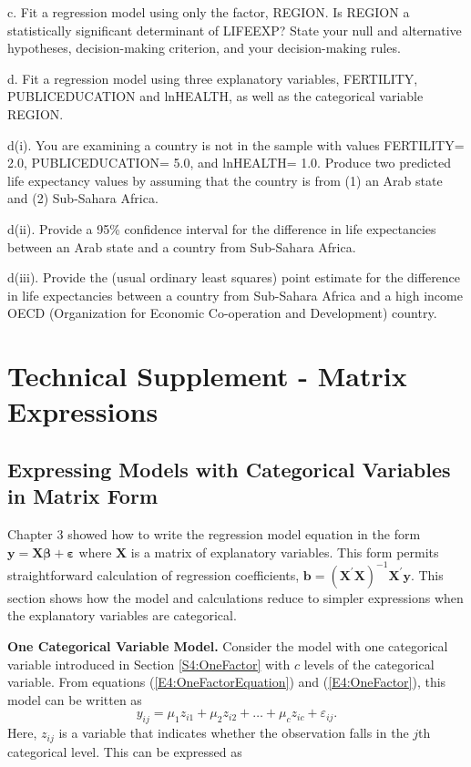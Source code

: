 \begin{exercises}
c. Fit a regression model using only the factor, REGION. Is REGION a
statistically significant determinant of LIFEEXP? State your null
and alternative hypotheses, decision-making criterion, and your
decision-making rules.

d. Fit a regression model using three explanatory variables,
FERTILITY, PUBLICEDUCATION and lnHEALTH, as well as the categorical
variable REGION.

d(i). You are examining a country is not in the sample with values
FERTILITY= 2.0, PUBLICEDUCATION= 5.0,  and lnHEALTH= 1.0. Produce
two predicted life expectancy values by assuming that the country is
from (1) an Arab state and (2) Sub-Sahara Africa.

d(ii). Provide a 95\% confidence interval for the difference in life
expectancies between an Arab state and a country from Sub-Sahara
Africa.

d(iii). Provide the (usual ordinary least squares) point estimate
for the difference in life expectancies between a country from
Sub-Sahara Africa and a high income OECD (Organization for Economic
Co-operation and Development) country.

\end{exercises}

\section{Technical Supplement - Matrix Expressions}
 \setcounter{equation}{12}
\subsection{Expressing Models with Categorical Variables in
Matrix Form}\label{S4:CatVarMatrix}

Chapter 3 showed how to write the regression model equation in the
form $\mathbf{y=X} \boldsymbol \beta + \boldsymbol \varepsilon$
where $\mathbf{X}$ is a matrix of explanatory variables. This form
permits straightforward calculation of regression coefficients,
$\mathbf{b} = \left(\mathbf{X}^{\prime}
\mathbf{X}\right)^{-1}\mathbf{X}^{\prime} \mathbf{y}$. This section
shows how the model and calculations reduce to simpler expressions
when the explanatory variables are categorical.


\textbf{One Categorical Variable Model.} Consider the model with one
categorical variable introduced in Section \ref{S4:OneFactor} with
$c$ levels of the categorical variable. From equations
(\ref{E4:OneFactorEquation}) and (\ref{E4:OneFactor}), this model
can be written as
\begin{equation*}
y_{ij} = \mu_1 z_{i1} + \mu_2 z_{i2} + \ldots + \mu_c z_{ic} +
\varepsilon_{ij}.
\end{equation*}
Here, $z_{ij}$ is a variable that indicates whether the observation
falls in the $j$th categorical level. This can be expressed as

